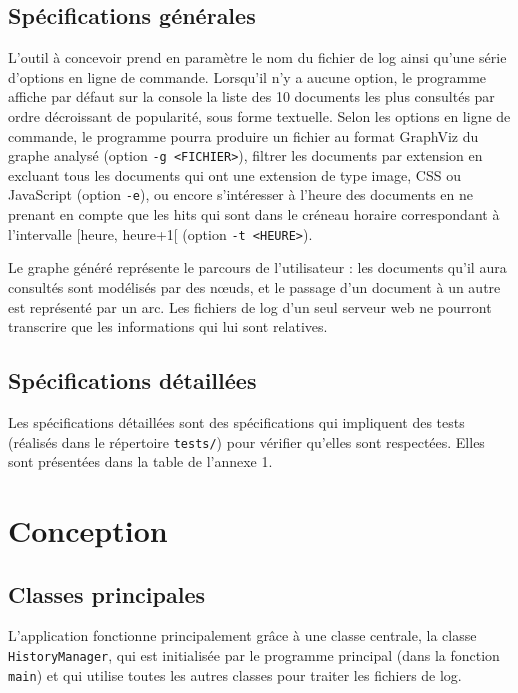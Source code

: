 \documentclass[11pt,a4paper]{article}
\begin{document}
	\subsection{Spécifications générales}
	
	L’outil à concevoir prend en paramètre le nom du fichier de log ainsi qu’une série d’options en ligne de commande. Lorsqu’il n’y a aucune option, le programme affiche par défaut sur la console la liste des 10 documents les plus consultés par ordre décroissant de popularité, sous forme textuelle. Selon les options en ligne de commande, le programme pourra produire un fichier au format GraphViz du graphe analysé (option \texttt{-g <FICHIER>}), filtrer les documents par extension en excluant tous les documents qui ont une extension de type image, CSS ou JavaScript (option \texttt{-e}), ou encore s’intéresser à l’heure des documents en ne prenant en compte que les hits qui sont dans le créneau horaire correspondant à l’intervalle [heure, heure+1[ (option \texttt{-t <HEURE>}).
	
	Le graphe généré représente le parcours de l’utilisateur : les documents qu’il aura consultés sont modélisés par des nœuds, et le passage d’un document à un autre est représenté par un arc. Les fichiers de log d’un seul serveur web ne pourront transcrire que les informations qui lui sont relatives.
	
	\subsection{Spécifications détaillées}
	
	Les spécifications détaillées sont des spécifications qui impliquent des tests (réalisés dans le répertoire \texttt{tests/}) pour vérifier qu'elles sont respectées. Elles sont présentées dans la table de l'annexe 1.
	
	\section{Conception}
	
	\subsection{Classes principales}
	
	L'application fonctionne principalement grâce à une classe centrale, la classe \texttt{HistoryManager}, qui est initialisée par le programme principal (dans la fonction \texttt{main}) et qui utilise toutes les autres classes pour traiter les fichiers de log.
	
\end{document}
